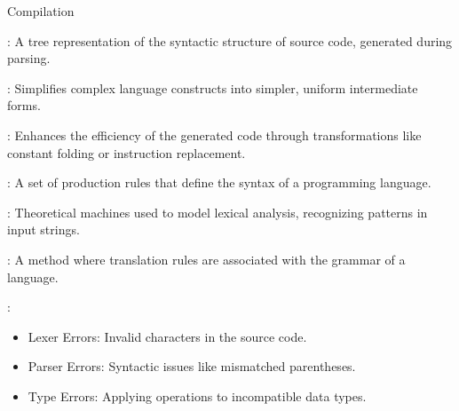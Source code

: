 \documentclass[hidelinks]{article}
\begin{document}
\begin{smodule}[title={Compilation Phases}]{Compilation}
    \begin{sdefinition}[for=SyntaxTree]
        : A tree representation of the syntactic structure of source code, generated during parsing.
    \end{sdefinition}
    
    \begin{sdefinition}[for=Desugaring]
        : Simplifies complex language constructs into simpler, uniform intermediate forms.
    \end{sdefinition}
    
    \begin{sdefinition}[for=Optimization]
        : Enhances the efficiency of the generated code through transformations like constant folding or instruction replacement.
    \end{sdefinition}
    
    \begin{sdefinition}[for=ContextFreeGrammar]
        : A set of production rules that define the syntax of a programming language.
    \end{sdefinition}
    
    \begin{sdefinition}[for=FiniteAutomata]
        : Theoretical machines used to model lexical analysis, recognizing patterns in input strings.
    \end{sdefinition}
    
    \begin{sdefinition}[for=SyntaxDirectedTranslation]
        : A method where translation rules are associated with the grammar of a language.
    \end{sdefinition}
    
    \begin{sdefinition}[for=ErrorTypes]
        : \begin{itemize}
          \item Lexer Errors: Invalid characters in the source code.
          \item Parser Errors: Syntactic issues like mismatched parentheses.
          \item Type Errors: Applying operations to incompatible data types.
        \end{itemize}
    \end{sdefinition}
    

\end{smodule}
\end{document}
